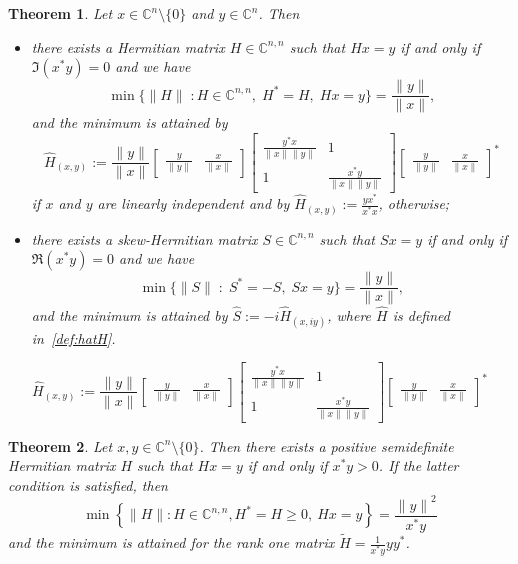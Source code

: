 \documentclass[10pt,a4paper]{amsart}
\newtheorem{theorem}{Theorem}
\newcommand{\C}{\mathbb C}
\newcommand {\mat}[1]{\left[\begin{array}{#1}}
\newcommand {\rix}{\end{array}\right]}
\begin{document}
\begin{theorem}\label{map:herm}
	Let $x \in \C^n\setminus\{0\}$ and $y\in \C^{n}$. Then
	\begin{itemize}
		\item [a)] there exists a Hermitian matrix $H \in \C^{n,n}$ such that $Hx = y$ if and only if $\Im{(x^*y)} = 0$ and we have
		\[
		\min\big\{\|H\|\; : H\in \C^{n,n},\; H^*=H, \; Hx=y\big\} = \frac{\|y\|}{\|x\|},
		\]
		and the minimum is attained by
		\begin{equation}\label{def:hatH}
			\hat H_{(x,y)} := \frac{\|y\|}{\|x\|}\mat{cc}\frac{y}{\|y\|}&\frac{x}{\|x\|} \rix \mat{cc}\frac{y^*x}{\|x\|\|y\|}&1\\1&\frac{x^*y}{\|x\|\|y\|} \rix \mat{cc}\frac{y}{\|y\|}&\frac{x}{\|x\|} \rix^*
		\end{equation}
		if $x$ and $y$ are linearly independent and by $\hat H_{(x,y)}:=\frac{yx^*}{x^*x}$, otherwise;
		\item [b)] there exists a skew-Hermitian matrix $S \in \C^{n,n}$ such that $Sx = y$ if and only if $\Re{(x^*y)} = 0$ and we have
		\[
		\min\big\{\|S\|\; :\; S ^*=-S, \; Sx=y\big\} = \frac{\|y\|}{\|x\|},
		\]
		and the minimum is attained by $\hat S:=-i\hat H_{(x,iy)}$, where $\hat{H}$ is defined in~\eqref{def:hatH}.
	\end{itemize}
\end{theorem}

		\begin{equation}
			\hat H_{(x,y)} := \frac{\|y\|}{\|x\|}\mat{cc}\frac{y}{\|y\|}&\frac{x}{\|x\|} \rix \mat{cc}\frac{y^*x}{\|x\|\|y\|}&1\\1&\frac{x^*y}{\|x\|\|y\|} \rix \mat{cc}\frac{y}{\|y\|}&\frac{x}{\|x\|} \rix^*
		\end{equation}

\begin{theorem}\label{map:def}
    Let $x,y \in \C^n \setminus \{0\}$. Then there exists a positive semidefinite Hermitian matrix $H$ such that $Hx=y$ if and only if $x^*y > 0$. If the latter condition is satisfied, then
    \[
    \min\left \{\|H\|:H \in \C^{n,n},H^*=H \geq 0,~Hx=y\right \}=\frac{{\|y\|}^2}{x^*y}
    \]
    and the minimum is attained for the rank one matrix
    $\tilde H=\frac{1}{x^*y}yy^*$.
\end{theorem}
\end{document}
